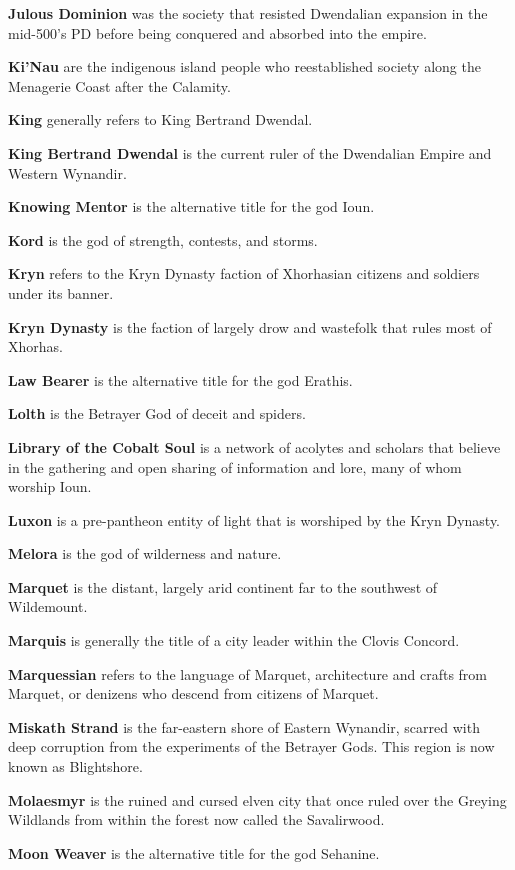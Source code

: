 \documentclass[10pt,a4paper,twoside,bg=print,twocolumn,openany,nodeprecatedcode]{dndbook}
\begin{document}
\textbf{Julous Dominion} was the society that resisted Dwendalian expansion in the mid-500's PD before being conquered and absorbed into the empire.

\textbf{Ki'Nau} are the indigenous island people who reestablished society along the Menagerie Coast after the Calamity.

\textbf{King} generally refers to King Bertrand Dwendal.

\textbf{King Bertrand Dwendal} is the current ruler of the Dwendalian Empire and Western Wynandir.

\textbf{Knowing Mentor} is the alternative title for the god Ioun.

\textbf{Kord} is the god of strength, contests, and storms.

\textbf{Kryn} refers to the Kryn Dynasty faction of Xhorhasian citizens and soldiers under its banner.

\textbf{Kryn Dynasty} is the faction of largely drow and wastefolk that rules most of Xhorhas.

\textbf{Law Bearer} is the alternative title for the god Erathis.

\textbf{Lolth} is the Betrayer God of deceit and spiders.

\textbf{Library of the Cobalt Soul} is a network of acolytes and scholars that believe in the gathering and open sharing of information and lore, many of whom worship Ioun.

\textbf{Luxon} is a pre-pantheon entity of light that is worshiped by the Kryn Dynasty.

\textbf{Melora} is the god of wilderness and nature.

\textbf{Marquet} is the distant, largely arid continent far to the southwest of Wildemount.

\textbf{Marquis} is generally the title of a city leader within the Clovis Concord.

\textbf{Marquessian} refers to the language of Marquet, architecture and crafts from Marquet, or denizens who descend from citizens of Marquet.

\textbf{Miskath Strand} is the far-eastern shore of Eastern Wynandir, scarred with deep corruption from the experiments of the Betrayer Gods. This region is now known as Blightshore.

\textbf{Molaesmyr} is the ruined and cursed elven city that once ruled over the Greying Wildlands from within the forest now called the Savalirwood.

\textbf{Moon Weaver} is the alternative title for the god Sehanine.
\end{document}
